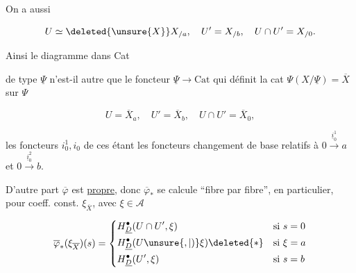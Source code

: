 
On a aussi

\[
 U\simeq \deleted{\unsure{X}}X_{/a},\quad U'=X_{/b},\quad U\cap U'=X_{/0}.
\]

Ainsi le diagramme dans Cat


de type $\underline\Psi$ n'est-il autre que le foncteur $\underline\Psi\longrightarrow\mathrm{Cat}$ qui définit la cat  $\Psi(X/\underline\Psi)=\overline X$ sur $\Psi$


\[
 U=\overline X_a,\quad U'=\overline X_b,\quad U\cap U'=\overline X_0,
\]

les foncteurs $i_0^1,i_0$ de ces étant les foncteurs changement de base relatifs à $0\xrightarrow{\underline i_0^1}a$ et $0\xrightarrow{\underline i_0^2}b$. 

D'autre part $\overline\varphi$ est \uline{propre}, donc $\overline\varphi_*$ se calcule ``fibre par fibre'', en particulier, pour coeff. const. $\xi_{\overline X}$, avec $\xi\in\mathcal A$

\[
 \overline\varphi_*(\xi_{\overline X})(s)=
 \left\{\begin{aligned}
  &H_{\underline D}^{\bullet}(U\cap U',\xi)&&\text{si }s=0\\
  &H^\bullet_{\underline D}(U\unsure{,|)}\xi)\deleted{*}&&\text{si }\xi=a\\
  &H^\bullet_{\underline D}(U',\xi)&&\text{si }s=b
 \end{aligned}\right.
\]
